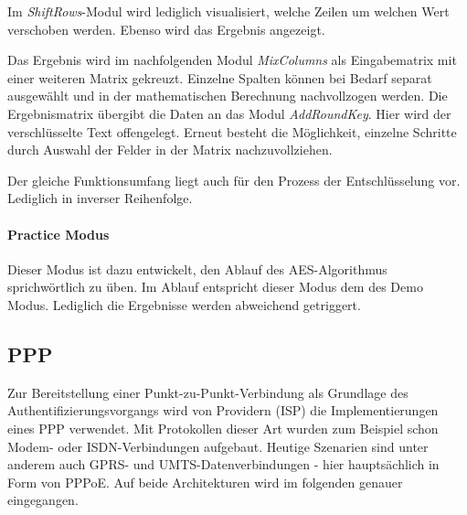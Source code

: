    Im \textit{ShiftRows}-Modul wird lediglich visualisiert, welche Zeilen um welchen Wert verschoben
   werden. Ebenso wird das Ergebnis angezeigt.

   Das Ergebnis wird im nachfolgenden Modul \textit{MixColumns} als Eingabematrix mit einer weiteren
   Matrix gekreuzt. Einzelne Spalten können bei Bedarf separat ausgewählt und in der
   mathematischen Berechnung nachvollzogen werden. Die Ergebnismatrix übergibt die Daten
   an das Modul \textit{AddRoundKey}.
   Hier wird der verschlüsselte Text offengelegt. Erneut besteht die Möglichkeit, einzelne Schritte
   durch Auswahl der Felder in der Matrix nachzuvollziehen.

   Der gleiche Funktionsumfang liegt auch für den Prozess der Entschlüsselung vor. Lediglich in
   inverser Reihenfolge\cite{michiganuni}.

   \paragraph{Practice Modus}
   Dieser Modus ist dazu entwickelt, den Ablauf des AES-Algorithmus sprichwörtlich zu üben.
   Im Ablauf entspricht dieser Modus dem des Demo Modus. Lediglich die Ergebnisse werden
   abweichend getriggert.



\subsection[PPP (Schenkel)]{PPP}
Zur Bereitstellung einer Punkt-zu-Punkt-Verbindung als Grundlage des Authentifizierungsvorgangs
wird von Providern (\ac{ISP}) die Implementierungen eines
\ac{PPP} verwendet. Mit Protokollen dieser Art wurden zum Beispiel schon Modem- oder ISDN-Verbindungen
aufgebaut. Heutige Szenarien sind unter anderem auch GPRS- und UMTS-Datenverbindungen -
hier hauptsächlich in
Form von \ac{PPPoE}. Auf beide Architekturen wird im folgenden
genauer eingegangen.

